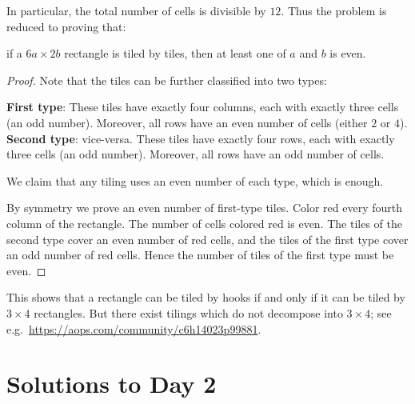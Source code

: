 In particular, the total number of cells is divisible by $12$.
Thus the problem is reduced to proving that:
\begin{claim*}
  if a $6a \times 2b$ rectangle is tiled by tiles,
  then at least one of $a$ and $b$ is even.
\end{claim*}
\begin{proof}
  Note that the tiles can be further classified into two types:
  \begin{itemize}
    \ii \textbf{First type}: These tiles have exactly four columns,
    each with exactly three cells (an odd number).
    Moreover, all rows have an even number of cells (either $2$ or $4$).
    \ii \textbf{Second type}: vice-versa.
    These tiles have exactly four rows,
    each with exactly three cells (an odd number).
    Moreover, all rows have an odd number of cells.
  \end{itemize}
  We claim that any tiling uses an even number of each type, which is enough.

  By symmetry we prove an even number of first-type tiles.
  Color red every fourth column of the rectangle.
  The number of cells colored red is even.
  The tiles of the second type cover an even number of red cells,
  and the tiles of the first type cover an odd number of red cells.
  Hence the number of tiles of the first type must be even.
\end{proof}

\begin{remark*}
  This shows that a rectangle can be tiled by hooks
  if and only if it can be tiled by $3 \times 4$ rectangles.
  But there exist tilings which do not decompose into $3 \times 4$;
  see e.g.\ \url{https://aops.com/community/c6h14023p99881}.
\end{remark*}
\pagebreak

\section{Solutions to Day 2}